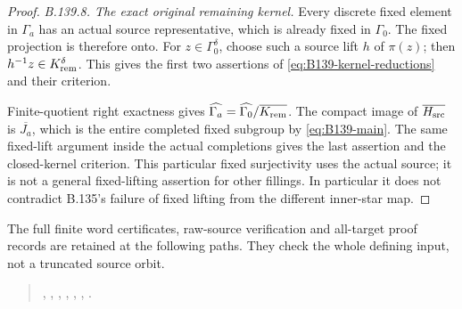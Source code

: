 \begin{proof}
\emph{B.139.8. The exact original remaining kernel.}
Every discrete fixed element in $\Gamma_a$ has an actual
source representative, which is already fixed in $\Gamma_0$.
The fixed projection is therefore onto.
For $z\in\Gamma_0^\delta$, choose such a source lift $h$ of
$\pi(z)$; then $h^{-1}z\in K_{\rm rem}^\delta$.
This gives the first two assertions of
\eqref{eq:B139-kernel-reductions} and their criterion.

Finite-quotient right exactness gives
$\widehat{\Gamma_a}
=\widehat{\Gamma_0}/\overline{K_{\rm rem}}$.
The compact image of $\overline{H_{\rm src}}$ is
$\overline{J_a}$, which is the entire completed fixed subgroup
by \eqref{eq:B139-main}.
The same fixed-lift argument inside the actual completions
gives the last assertion and the closed-kernel criterion.
This particular fixed surjectivity uses the actual source;
it is not a general fixed-lifting assertion for other fillings.
In particular it does not contradict B.135's failure of
fixed lifting from the different inner-star map.
\end{proof}

The full finite word certificates, raw-source verification and
all-target proof records are retained at the following paths.
They check the whole defining input, not a truncated source orbit.
\begin{quote}\footnotesize\raggedright
{},
,
,
,
,
,
.
\end{quote}
